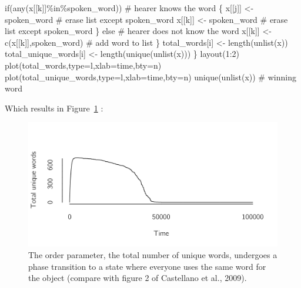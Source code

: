 \documentclass[
  a4paper,
  DIV=11,
  numbers=noendperiod]{scrreprt}
\newenvironment{Shaded}{\begin{snugshade}}{\end{snugshade}}
\newcommand{\AttributeTok}[1]{\textcolor[rgb]{0.40,0.45,0.13}{#1}}
\newcommand{\CommentTok}[1]{\textcolor[rgb]{0.37,0.37,0.37}{#1}}
\newcommand{\ControlFlowTok}[1]{\textcolor[rgb]{0.00,0.23,0.31}{#1}}
\newcommand{\DecValTok}[1]{\textcolor[rgb]{0.68,0.00,0.00}{#1}}
\newcommand{\FunctionTok}[1]{\textcolor[rgb]{0.28,0.35,0.67}{#1}}
\newcommand{\NormalTok}[1]{\textcolor[rgb]{0.00,0.23,0.31}{#1}}
\newcommand{\OtherTok}[1]{\textcolor[rgb]{0.00,0.23,0.31}{#1}}
\newcommand{\SpecialCharTok}[1]{\textcolor[rgb]{0.37,0.37,0.37}{#1}}
\newcommand{\StringTok}[1]{\textcolor[rgb]{0.13,0.47,0.30}{#1}}
\begin{document}
\begin{Shaded}
\begin{Highlighting}[]
    \ControlFlowTok{if}\NormalTok{(}\FunctionTok{any}\NormalTok{(x[[k]]}\SpecialCharTok{\%in\%}\NormalTok{spoken\_word)) }\CommentTok{\# hearer knows the word}
\NormalTok{    \{}
\NormalTok{      x[[j]] }\OtherTok{\textless{}{-}}\NormalTok{ spoken\_word }\CommentTok{\# erase list except spoken\_word}
\NormalTok{      x[[k]] }\OtherTok{\textless{}{-}}\NormalTok{ spoken\_word }\CommentTok{\# erase list except spoken\_word}
\NormalTok{    \} }\ControlFlowTok{else} \CommentTok{\# hearer does not know the word}
\NormalTok{      x[[k]] }\OtherTok{\textless{}{-}} \FunctionTok{c}\NormalTok{(x[[k]],spoken\_word)  }\CommentTok{\# add word to list}
\NormalTok{  \} }
\NormalTok{  total\_words[i] }\OtherTok{\textless{}{-}} \FunctionTok{length}\NormalTok{(}\FunctionTok{unlist}\NormalTok{(x))}
\NormalTok{  total\_unique\_words[i] }\OtherTok{\textless{}{-}} \FunctionTok{length}\NormalTok{(}\FunctionTok{unique}\NormalTok{(}\FunctionTok{unlist}\NormalTok{(x)))}
\NormalTok{\}}
\FunctionTok{layout}\NormalTok{(}\DecValTok{1}\SpecialCharTok{:}\DecValTok{2}\NormalTok{)}
\FunctionTok{plot}\NormalTok{(total\_words,}\AttributeTok{type=}\StringTok{\textquotesingle{}l\textquotesingle{}}\NormalTok{,}\AttributeTok{xlab=}\StringTok{\textquotesingle{}time\textquotesingle{}}\NormalTok{,}\AttributeTok{bty=}\StringTok{\textquotesingle{}n\textquotesingle{}}\NormalTok{)}
\FunctionTok{plot}\NormalTok{(total\_unique\_words,}\AttributeTok{type=}\StringTok{\textquotesingle{}l\textquotesingle{}}\NormalTok{,}\AttributeTok{xlab=}\StringTok{\textquotesingle{}time\textquotesingle{}}\NormalTok{,}\AttributeTok{bty=}\StringTok{\textquotesingle{}n\textquotesingle{}}\NormalTok{)}
\FunctionTok{unique}\NormalTok{(}\FunctionTok{unlist}\NormalTok{(x)) }\CommentTok{\# winning word}
\end{Highlighting}
\end{Shaded}

Which results in Figure~\ref{fig-ch7-img3-old-91} :

\begin{figure}

{\centering \includegraphics{media/ch7/fig-ch7-img3-old-91.png}

}

\caption{\label{fig-ch7-img3-old-91}The order parameter, the total
number of unique words, undergoes a phase transition to a state where
everyone uses the same word for the object (compare with figure 2 of
Castellano et al., 2009).}

\end{figure}
\end{document}
